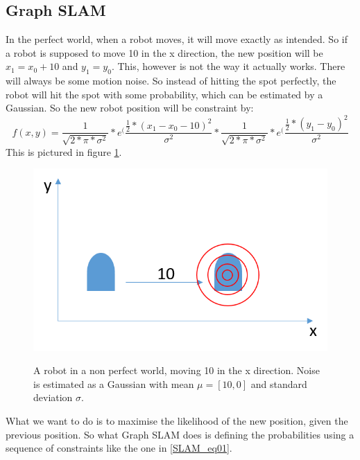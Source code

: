 \subsection{Graph SLAM}
In the perfect world, when a robot moves, it will move exactly as intended. So if a robot is supposed to move 10 in the x direction, the new position will be $x_1 = x_0 + 10$ and $y_1 = y_0$. 
This, however is not the way it actually works. There will always be some motion noise. So instead of hitting the spot perfectly, the robot will hit the spot with some probability, which can be estimated by a Gaussian. So the new robot position will be constraint by:
\begin{equation}
f(x,y)=\frac{1}{\sqrt{2*\pi*\sigma^2}}*e^(\frac{\frac{1}{2}*(x_1-x_0-10)^2}{\sigma^2}*\frac{1}{\sqrt{2*\pi*\sigma^2}}*e^(\frac{\frac{1}{2}*(y_1-y_0)^2}{\sigma^2}
\end{equation}\label{SLAM_eq01}
This is pictured in figure \ref{SLAM_fig02}.
\begin{figure}[h!]
    \includegraphics{billeder/GraphSLAM02.png} \label{SLAM_fig02}
    \caption{A robot in a non perfect world, moving 10 in the x direction. Noise is estimated as a Gaussian with mean $\mu = [10,0]$ and standard deviation $\sigma$.}
\end{figure}
What we want to do is to maximise the likelihood of the new position, given the previous position.
So what Graph SLAM does is defining the probabilities using a sequence of constraints like the one in \ref{SLAM_eq01}. 
